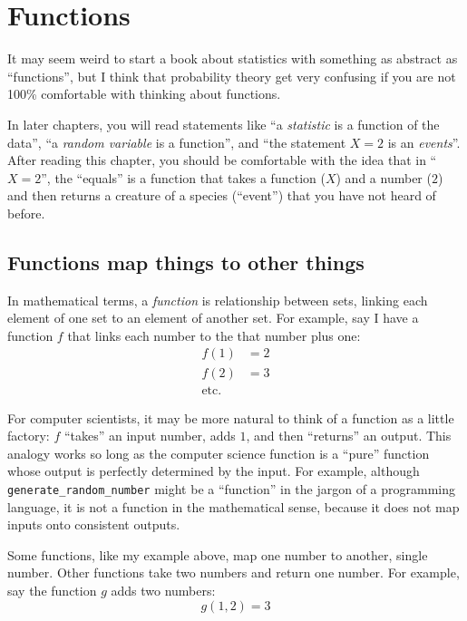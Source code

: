 
\chapter{Functions}
\label{chapter:functions}

It may seem weird to start a book about statistics with something as abstract
as ``functions'', but I think that probability theory get very confusing if you
are not 100\% comfortable with thinking about functions.

In later chapters, you will read statements like ``a \emph{statistic} is a
function of the data'', ``a \emph{random variable} is a function'', and ``the
statement $X=2$ is an \emph{events}''. After reading this chapter, you should
be comfortable with the idea that in ``$X=2$'', the ``equals'' is a function
that takes a function ($X$) and a number ($2$) and then returns a creature of a
species (``event'') that you have not heard of before.

\section{Functions map things to other things}

In mathematical terms, a \emph{function} is relationship between sets, linking
each element of one set to an element of another set. For example, say I have a
function $f$ that links each number to the that number plus one:
\begin{align*}
f(1) &= 2 \\
f(2) &= 3 \\
\text{etc.}
\end{align*}

For computer scientists, it may be more natural to think of a function as a
little factory: $f$ ``takes'' an input number, adds $1$, and then ``returns''
an output. This analogy works so long as the computer science function is a
``pure'' function whose output is perfectly determined by the input. For
example, although \texttt{generate\_random\_number} might be a ``function'' in
the jargon of a programming language, it is not a function in the mathematical
sense, because it does not map inputs onto consistent outputs.

Some functions, like my example above, map one number to another, single
number. Other functions take two numbers and return one number. For example, say
the function $g$ adds two numbers:
\begin{equation*}
g(1, 2) = 3
\end{equation*}

